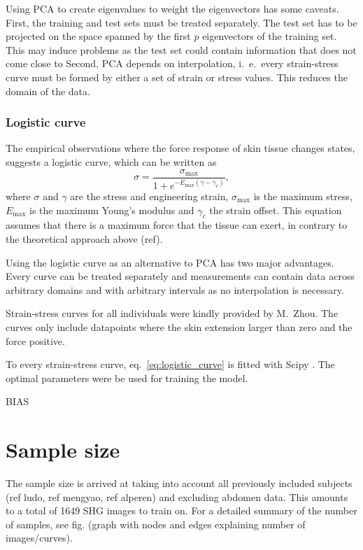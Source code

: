 Using PCA to create eigenvalues to weight the eigenvectors has some caveats.
First, the training and test sets must be treated separately.
The test set has to be projected on the space spanned by the first $p$ eigenvectors of the training set.
This may induce problems as the test set could contain information that does not come close to
Second, PCA depends on interpolation, i.\ e.\ every strain-stress curve must be formed by either a set of strain or stress values.
This reduces the domain of the data.

\subsubsection{Logistic curve}
The empirical observations where the force response of skin tissue changes states, suggests a logistic curve, which can be written as
\begin{equation}\label{eq:logistic_curve}
  \sigma = \frac{\sigma_\mathrm{max}}{1+e^{-E_\mathrm{max} (\gamma - \gamma_c)}},
\end{equation}
where $\sigma$ and $\gamma$ are the stress and engineering strain, $\sigma_\mathrm{max}$ is the maximum stress, $E_\mathrm{max}$ is the maximum Young's modulus and $\gamma_c$ the strain offset.
This equation assumes that there is a maximum force that the tissue can exert, in contrary to the theoretical approach above (ref).

Using the logistic curve as an alternative to PCA has two major advantages.
Every curve can be treated separately and measurements can contain data across arbitrary domains and with arbitrary intervals as no interpolation is necessary.

Strain-stress curves for all individuals were kindly provided by M.\ Zhou.
The curves only include datapoints where the skin extension larger than zero and the force positive.

To every strain-stress curve, eq.~\ref{eq:logistic_curve} is fitted with Scipy \cite{2020SciPy-NMeth}.
The optimal parameters were be used for training the model.

BIAS

\section{Sample size}
The sample size is arrived at taking into account all previously included subjects (ref ludo, ref mengyao, ref alperen) and excluding abdomen data.
This amounts to a total of 1649 SHG images to train on.
For a detailed summary of the number of samples, see fig. (graph with nodes and edges explaining number of images/curves).

